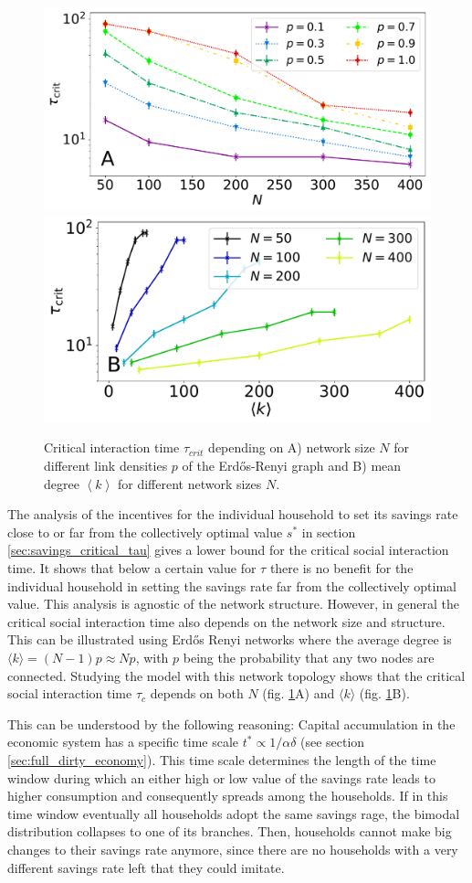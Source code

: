 \begin{figure}
  \centering
  \includegraphics[width = .6 \textwidth]{figures/taucrit_N2.pdf}
  \includegraphics[width = .6 \textwidth]{figures/taucrit_N_k.pdf}
\caption[Critical interaction time depending on network size and mean degree]{Critical interaction time $\tau_{crit}$ depending on A) network size $N$ for different link densities $p$ of the Erd\H{o}s-Renyi graph and B) mean degree $\left< k \right>$ for different network sizes $N$.}
  \label{fig:taucrit}
\end{figure}
The analysis of the incentives for the individual household to set its savings rate close to or far from the collectively optimal value $s^*$ in section \ref{sec:savings_critical_tau} gives a lower bound for the critical social interaction time. It shows that below a certain value for $\tau$ there is no benefit for the individual household in setting the savings rate far from the collectively optimal value. 
This analysis is agnostic of the network structure. However, in general the critical social interaction time also depends on the network size and structure. 
This can be illustrated using Erd\H{o}s Renyi networks where the average degree is $\langle k \rangle = (N-1)p \approx Np$, with $p$ being the probability that any two nodes are connected. Studying the model with this network topology shows that the critical social interaction time $\tau_{c}$ depends on both $N$ (fig. \ref{fig:taucrit}A) and $\langle k \rangle$ (fig. \ref{fig:taucrit}B). 

This can be understood by the following reasoning: Capital accumulation in the economic system has a specific time scale $t^* \propto 1/\alpha\delta$ (see section \ref{sec:full_dirty_economy}). This time scale determines the length of the time window during which an either high or low value of the savings rate leads to higher consumption and consequently spreads among the households. If in this time window eventually all households adopt the same savings rage, the bimodal distribution collapses to one of its branches. Then, households cannot make big changes to their savings rate anymore, since there are no households with a very different savings rate left that they could imitate.

